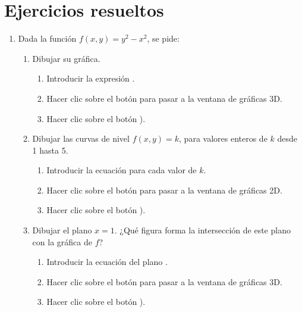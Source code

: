 \section{Ejercicios resueltos}
\begin{enumerate}[leftmargin=*]
\item Dada la función $f(x,y)=y^2-x^2$, se pide:
\begin{enumerate}
\item Dibujar su gráfica. 
\begin{indicacion}
\begin{enumerate}
\item Introducir la expresión .
\item Hacer clic sobre el botón  para pasar a la ventana de gráficas 3D.
\item Hacer clic sobre el botón ).
\end{enumerate}
\end{indicacion}

\item Dibujar las curvas de nivel $f(x,y)=k$, para valores enteros de $k$ desde 1 hasta 5.
\begin{indicacion}
\begin{enumerate}
\item Introducir la ecuación  para cada valor de $k$.
\item Hacer clic sobre el botón  para pasar a la ventana de gráficas 2D.
\item Hacer clic sobre el botón ).
\end{enumerate}
\end{indicacion}

\item Dibujar el plano $x=1$. ¿Qué figura forma la intersección de este plano con la gráfica de $f$?
\begin{indicacion}
\begin{enumerate}
\item Introducir la ecuación del plano .
\item Hacer clic sobre el botón  para pasar a la ventana de gráficas 3D.
\item Hacer clic sobre el botón ).
\end{enumerate}
\end{indicacion}


\end{enumerate}
\end{enumerate}
